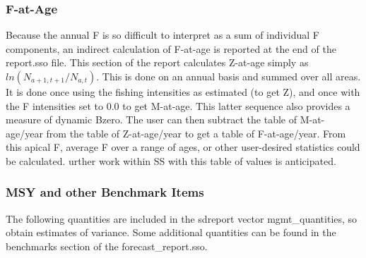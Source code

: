 \subsubsection{F-at-Age}
Because the annual F is so difficult to interpret as a sum of individual F components, an indirect calculation of F-at-age is reported at the end of the report.sso file. This section of the report calculates Z-at-age simply as $ln(N_{a+1,t+1}/N_{a,t})$. This is done on an annual basis and summed over all areas. It is done once using the fishing intensities as estimated (to get Z), and once with the F intensities set to 0.0 to get M-at-age. This latter sequence also provides a measure of dynamic Bzero.  The user can then subtract the table of M-at-age/year from the table of Z-at-age/year to get a table of F-at-age/year. From this apical F, average F over a range of ages, or other user-desired statistics could be calculated.  urther work within SS with this table of values is anticipated.

\subsubsection{MSY and other Benchmark Items}
The following quantities are included in the sdreport vector mgmt\_quantities, so obtain estimates of variance.  Some additional quantities can be found in the benchmarks section of the forecast\_report.sso.

